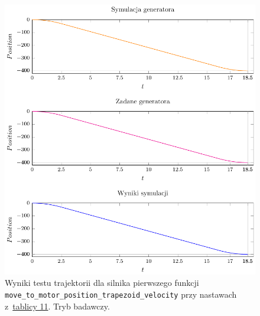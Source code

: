\documentclass[a4paper, 12pt]{article}
\begin{document}
	\begin{figure}[H]
		\centering
		\includegraphics[scale=1.1]{raport_graphs/simpMPVRrevers.pdf}
		\caption{Wyniki testu trajektorii dla silnika pierwszego funkcji \texttt{move\_to\_motor\_position\_trapezoid\_velocity} przy nastawach z~\hyperref[tab:setup4]{tablicy 11}. Tryb badawczy.}
		\label{fig:simpMPVRrevers}
	\end{figure}
	
\end{document}
